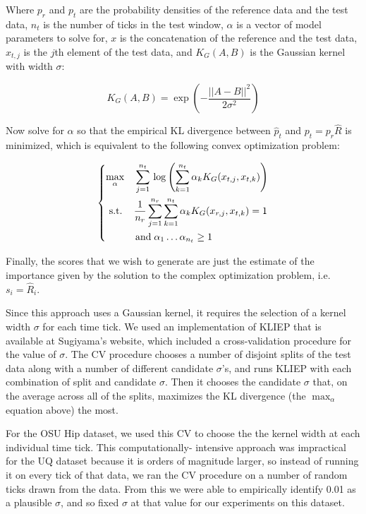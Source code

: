 Where $p_{r}$ and $p_{t}$ are the probability densities of the reference data and the test
data, $n_{t}$ is the number of ticks in the test window, $\alpha$ is a
vector of model parameters to solve for, $x$ is the concatenation of the reference and the
test data, $x_{t,j}$ is the $j$th element of the test data,
and $K_G(A,B)$ is the Gaussian kernel with width $\sigma$:

\[
K_G(A,B) = \exp \left(-\frac{||A-B||^2}{2\sigma^2}\right)
\]

Now solve for $\alpha$ so that the empirical KL divergence between $\hat{p}_{t}$ and
$p_{t} = p_{r}\hat{R}$ is minimized, which is equivalent to the following convex optimization
problem:

\[
\begin{dcases}
 \max_{\alpha} \quad \sum_{j=1}^{n_t} \, \log \left( \sum_{k=1}^{n_t} \alpha_k K_G(x_{t,j}, x_{t,k}) \right) \\
 \,\, \text{s.t.} \quad\, \frac{1}{n_r} \sum_{j=1}^{n_r} \sum_{k=1}^{n_t} \alpha_k K_G(x_{r,j},x_{t,k}) = 1 \\
 \qquad \quad \text{and} \; \alpha_1 \ldots \alpha_{n_t} \ge 1
\end{dcases}
\]

Finally, the scores that we wish to generate are just the estimate of the importance given by the
solution to the complex optimization problem, i.e. $s_i = \hat{R}_i$.

Since this approach uses a Gaussian kernel, it requires the selection of
a kernel width $\sigma$ for each time tick. We used an implementation of
KLIEP that is available at Sugiyama's website, which included a cross-validation
procedure for the value of $\sigma$. The CV procedure chooses a number of disjoint
splits of the test data along with a number of different candidate $\sigma$'s, and runs
KLIEP with each combination of split and candidate $\sigma$. Then it chooses the candidate $\sigma$
that, on the average across all of the splits, maximizes the KL divergence (the
$\max_{\alpha}$ equation above) the most.

For the OSU Hip dataset, we used this
CV to choose the the kernel width at each individual time tick. This computationally-
intensive approach was impractical for the UQ dataset because it is orders of magnitude larger,
so instead of running it on every tick of that data, we ran the CV procedure on a number of
random ticks drawn from the data. From this we were able
to empirically identify 0.01 as a plausible $\sigma$, and so fixed $\sigma$
at that value for our experiments on this dataset.


